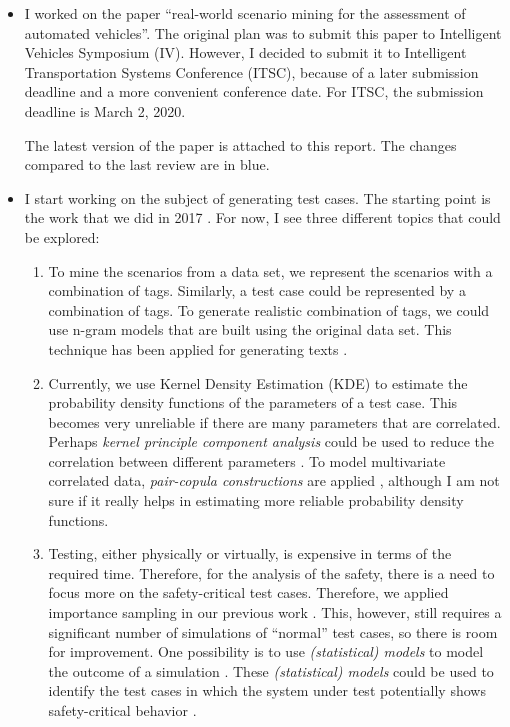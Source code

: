 \documentclass[10pt,final,a4paper,oneside,onecolumn]{article}
\begin{document}
\begin{itemize}
	\item I worked on the paper ``real-world scenario mining for the assessment of automated vehicles''. The original plan was to submit this paper to Intelligent Vehicles Symposium (IV). However, I decided to submit it to Intelligent Transportation Systems Conference (ITSC), because of a later submission deadline and a more convenient conference date. For ITSC, the submission deadline is March 2, 2020. 
	
	The latest version of the paper is attached to this report. The changes compared to the last review are in blue.
	
	\item I start working on the subject of generating test cases. The starting point is the work that we did in 2017 \cite{deGelder2017assessment}. For now, I see three different topics that could be explored:
	\begin{enumerate}
		\item To mine the scenarios from a data set, we represent the scenarios with a combination of tags. Similarly, a test case could be represented by a combination of tags. To generate realistic combination of tags, we could use n-gram models that are built using the original data set. This technique has been applied for generating texts \cite{oh2002stochastic,langkilde1998practical}.
		\item Currently, we use Kernel Density Estimation (KDE) to estimate the probability density functions of the parameters of a test case. This becomes very unreliable if there are many parameters that are correlated. Perhaps \emph{kernel principle component analysis} could be used to reduce the correlation between different parameters \cite{scholkopf1997kernel}. To model multivariate correlated data, \emph{pair-copula constructions} are applied \cite{czado2010paircopula}, although I am not sure if it really helps in estimating more reliable probability density functions.
		\item Testing, either physically or virtually, is expensive in terms of the required time. Therefore, for the analysis of the safety, there is a need to focus more on the safety-critical test cases. Therefore, we applied importance sampling in our previous work \cite{deGelder2017assessment}. This, however, still requires a significant number of simulations of ``normal'' test cases, so there is room for improvement. One possibility is to use \emph{(statistical) models} to model the outcome of a simulation \cite{dubourg2013metamodel}. These \emph{(statistical) models} could be used to identify the test cases in which the system under test potentially shows safety-critical behavior \cite{dubourg2013metamodel}. 
	\end{enumerate}
\end{itemize}
\end{document}
